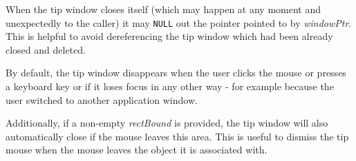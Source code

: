 When the tip window closes itself (which may happen at any moment and
unexpectedly to the caller) it may {\tt NULL} out the pointer pointed to by 
{\it windowPtr}. This is helpful to avoid dereferencing the tip window which
had been already closed and deleted.


\label{wxtipwindowsetboundingrect}


By default, the tip window disappears when the user clicks the mouse or presses
a keyboard key or if it loses focus in any other way - for example because the
user switched to another application window.

Additionally, if a non-empty {\it rectBound} is provided, the tip window will
also automatically close if the mouse leaves this area. This is useful to
dismiss the tip mouse when the mouse leaves the object it is associated with.



